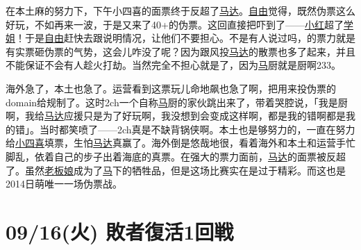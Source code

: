 在本土麻的努力下，下午小四喜的面票终于反超了\uline{马达}。\uline{自由}觉得，既然伪票这么好玩，不如再来一波，于是又来了40+的伪票。这回直接把吓到了——\uline{小红}超了\uline{学姐}！于是\uline{自由}赶快去跟说明情况，让他们不要担心。不是有人说过吗，的票力就是有实票砸伪票的气势，这会儿咋没了呢？因为跟风投\uline{马达}的散票也多了起来，并且不能保证不会有人趁火打劫。当然完全不担心就是了，因为\uline{马}厨就是厨啊233。

海外急了，本土也急了。运营看到这票玩儿命地飙也急了啊，把用来投伪票的domain给规制了。这时2ch一个自称\uline{马}厨的家伙跳出来了，带着哭腔说，「我是厨啊，我给\uline{马达}应援只是为了好玩啊，我没想到会变成这样啊，都是我的错啊都是我的错」。当时都笑喷了——2ch真是不缺背锅侠啊。本土也是够努力的，一直在努力给\uline{小四喜}填票，生怕\uline{马达}真赢了。海外倒是悠哉地很，看着海外和本土和运营手忙脚乱，依着自己的步子出着海底的真票。在强大的票力面前，\uline{马达}的面票被反超了。虽然\uline{老板娘}成为了\uline{马}下的牺牲品，但是这场比赛实在是过于精彩。而这也是2014日萌唯一一场伪票战。

\section{09/16(火) 敗者復活1回戦}

